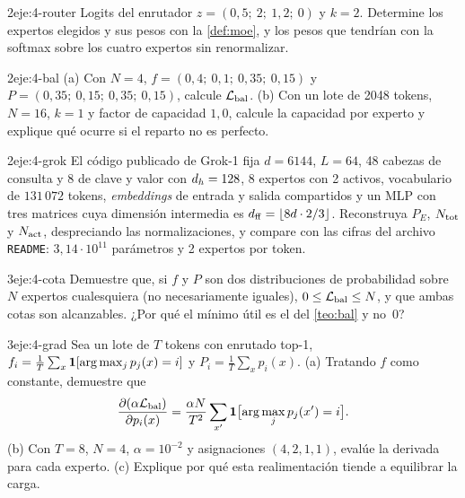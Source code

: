 \begin{ejercicio}{2}{eje:4-router}
Logits del enrutador $z=(0{,}5;\ 2;\ 1{,}2;\ 0)$ y $k=2$. Determine los expertos elegidos y sus pesos con la \cref{def:moe}, y los pesos que tendrían con la softmax sobre los cuatro expertos sin renormalizar.
\end{ejercicio}

\begin{ejercicio}{2}{eje:4-bal}
(a) Con $N=4$, $f=(0{,}4;\ 0{,}1;\ 0{,}35;\ 0{,}15)$ y $P=(0{,}35;\ 0{,}15;\ 0{,}35;\ 0{,}15)$, calcule $\mathcal{L}_{\mathrm{bal}}$. (b) Con un lote de 2048 tokens, $N=16$, $k=1$ y factor de capacidad $1{,}0$, calcule la capacidad por experto y explique qué ocurre si el reparto no es perfecto.
\end{ejercicio}

\begin{ejercicio}{2}{eje:4-grok}
El código publicado de Grok-1 fija $d=6144$, $L=64$, 48 cabezas de consulta y 8 de clave y valor con $d_{h}=128$, 8 expertos con 2 activos, vocabulario de $131\,072$ tokens, \emph{embeddings} de entrada y salida compartidos y un MLP con tres matrices cuya dimensión intermedia es $d_{\mathrm{ff}}=\lfloor 8d\cdot 2/3\rfloor$. Reconstruya $P_E$, $N_{\mathrm{tot}}$ y $N_{\mathrm{act}}$, despreciando las normalizaciones, y compare con las cifras del archivo \texttt{README}: $3{,}14\cdot 10^{11}$ parámetros y 2 expertos por token.
\end{ejercicio}

\begin{ejercicio}{3}{eje:4-cota}
Demuestre que, si $f$ y $P$ son dos distribuciones de probabilidad sobre $N$ expertos cualesquiera (no necesariamente iguales), $0\le\mathcal{L}_{\mathrm{bal}}\le N$, y que ambas cotas son alcanzables. ¿Por qué el mínimo útil es el del \cref{teo:bal} y no~0?
\end{ejercicio}

\begin{ejercicio}{3}{eje:4-grad}
Sea un lote de $T$ tokens con enrutado top-1, $f_i=\frac1T\sum_{x}\mathbf{1}[\arg\max_jp_j(x)=i]$ y $P_i=\frac1T\sum_xp_i(x)$. (a) Tratando $f$ como constante, demuestre que
\[
\frac{\partial(\alpha\mathcal{L}_{\mathrm{bal}})}{\partial p_i(x)}=\frac{\alpha N}{T^{2}}\sum_{x'}\mathbf{1}\bigl[\arg\max_jp_j(x')=i\bigr].
\]
(b) Con $T=8$, $N=4$, $\alpha=10^{-2}$ y asignaciones $(4,2,1,1)$, evalúe la derivada para cada experto. (c) Explique por qué esta realimentación tiende a equilibrar la carga.
\end{ejercicio}
